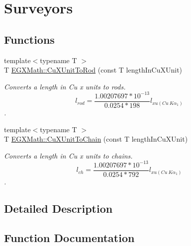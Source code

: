 \hypertarget{group___e_g_x_math-_conversions-_length_conversions-_non-_s_i-_cu_x_unit-_surveyors}{}\section{Surveyors}
\label{group___e_g_x_math-_conversions-_length_conversions-_non-_s_i-_cu_x_unit-_surveyors}
\subsection*{Functions}
\begin{DoxyCompactItemize}
\item 
{\footnotesize template$<$typename T $>$ }\\T \mbox{\hyperlink{group___e_g_x_math-_conversions-_length_conversions-_non-_s_i-_cu_x_unit-_surveyors_ga3506ca573e8ba770792a7cf123bceb79}{E\+G\+X\+Math\+::\+Cu\+X\+Unit\+To\+Rod}} (const T length\+In\+Cu\+X\+Unit)
\begin{DoxyCompactList}\small\item\em Converts a length in Cu x units to rods. \[ l_{rod}= \frac{1.00207697*10^{-13}}{0.0254 * 198} l_{xu(Cu\ K\alpha_1)} \]. \end{DoxyCompactList}\item 
{\footnotesize template$<$typename T $>$ }\\T \mbox{\hyperlink{group___e_g_x_math-_conversions-_length_conversions-_non-_s_i-_cu_x_unit-_surveyors_ga504934f43d4950cb582134d718952f3b}{E\+G\+X\+Math\+::\+Cu\+X\+Unit\+To\+Chain}} (const T length\+In\+Cu\+X\+Unit)
\begin{DoxyCompactList}\small\item\em Converts a length in Cu x units to chains. \[ l_{ch}= \frac{1.00207697*10^{-13}}{0.0254 * 792} l_{xu(Cu\ K\alpha_1)} \]. \end{DoxyCompactList}\end{DoxyCompactItemize}


\subsection{Detailed Description}


\subsection{Function Documentation}
\mbox{\label{group___e_g_x_math-_conversions-_length_conversions-_non-_s_i-_cu_x_unit-_surveyors_ga504934f43d4950cb582134d718952f3b}} 
